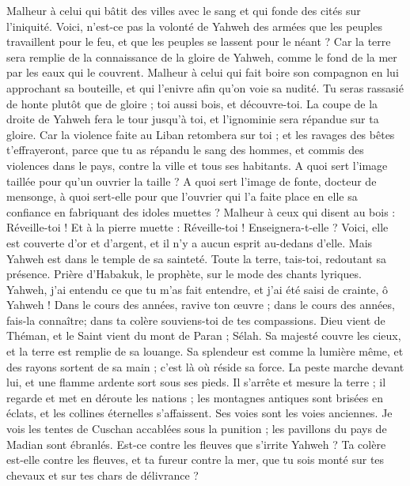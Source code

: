 \begin{multicols}{2}
Malheur à celui qui bâtit des villes avec le sang et qui fonde des cités sur l'iniquité.
Voici, n'est-ce pas la volonté de Yahweh des armées que les peuples travaillent pour le feu, et que les peuples se lassent pour le néant ?
Car la terre sera remplie de la connaissance de la gloire de Yahweh, comme le fond de la mer par les eaux qui le couvrent.
Malheur à celui qui fait boire son compagnon en lui approchant sa bouteille, et qui l'enivre afin qu'on voie sa nudité.
Tu seras rassasié de honte plutôt que de gloire ; toi aussi bois, et découvre-toi. La coupe de la droite de Yahweh fera le tour jusqu'à toi, et l'ignominie sera répandue sur ta gloire.
Car la violence faite au Liban retombera sur toi ; et les ravages des bêtes t'effrayeront, parce que tu as répandu le sang des hommes, et commis des violences dans le pays, contre la ville et tous ses habitants.
A quoi sert l'image taillée pour qu'un ouvrier la taille ? A quoi sert l'image de fonte, docteur de mensonge, à quoi sert-elle pour que l'ouvrier qui l'a faite place en elle sa confiance en fabriquant des idoles muettes ?
Malheur à ceux qui disent au bois : Réveille-toi ! Et à la pierre muette : Réveille-toi ! Enseignera-t-elle ? Voici, elle est couverte d'or et d'argent, et il n'y a aucun esprit au-dedans d'elle.
Mais Yahweh est dans le temple de sa sainteté. Toute la terre, tais-toi, redoutant sa présence.
\VerseOne{}Prière d'Habakuk, le prophète, sur le mode des chants lyriques.
Yahweh, j'ai entendu ce que tu m'as fait entendre, et j'ai été saisi de crainte, ô Yahweh ! Dans le cours des années, ravive ton œuvre ; dans le cours des années, fais-la connaître; dans ta colère souviens-toi de tes compassions.
Dieu vient de Théman, et le Saint vient du mont de Paran ; Sélah. Sa majesté couvre les cieux, et la terre est remplie de sa louange.
Sa splendeur est comme la lumière même, et des rayons sortent de sa main ; c'est là où réside sa force.
La peste marche devant lui, et une flamme ardente sort sous ses pieds.
Il s'arrête et mesure la terre ; il regarde et met en déroute les nations ; les montagnes antiques sont brisées en éclats, et les collines éternelles s'affaissent. Ses voies sont les voies anciennes.
Je vois les tentes de Cuschan accablées sous la punition ; les pavillons du pays de Madian sont ébranlés.
Est-ce contre les fleuves que s'irrite Yahweh ? Ta colère est-elle contre les fleuves, et ta fureur contre la mer, que tu sois monté sur tes chevaux et sur tes chars de délivrance ?

\end{multicols}
